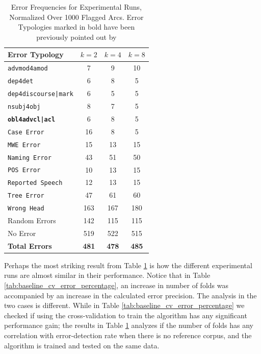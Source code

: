 \begin{table}[h]
    \centering
    \begin{tabular}{|l|c|c|c|}
        \hline
        \textbf{Error Typology} & \textbf{\(k = 2\)} & \textbf{\(k= 4\)} & \textbf{\(k=8\)} \\
        \hline
        \texttt{advmod4amod} & 7 & 9 & 10\\
        \texttt{dep4det} & 6 & 8 & 5\\
        \texttt{dep4discourse|mark} & 6 & 5 & 5\\
        \texttt{nsubj4obj} & 8 & 7 & 5\\
        \textbf{\texttt{obl4advcl|acl}} & 6 & 8 & 5\\
        \texttt{Case Error} & 16 & 8 & 5\\
        \texttt{MWE Error} & 15 & 13 & 15\\
        \texttt{Naming Error} & 43 & 51 & 50\\
        \texttt{POS Error} & 10 & 13 & 15\\
        \texttt{Reported Speech} & 12 & 13 & 15\\
        \texttt{Tree Error} & 47 & 61 & 60\\
        \texttt{Wrong Head} & 163 & 167 & 180\\
        Random Errors & 142 & 115 & 115\\
        No Error & 519 & 522 & 515\\
        \hline
        \textbf{Total Errors} & \textbf{481} & \textbf{478} & \textbf{485}\\
\hline
    \end{tabular}
    \caption[Error Frequencies for Experimental Runs, Normalized Over 1000 Flagged Arcs]{Error Frequencies for Experimental Runs, Normalized Over 1000 Flagged Arcs. Error Typologies marked in bold have been previously pointed out by \cite{alzetta2017dangerous}}
    \label{tab:normalized_experimental_lisca}
\end{table}

Perhaps the most striking result from Table \ref{tab:normalized_experimental_lisca} is how the different experimental runs are almost similar in their performance. Notice that in Table \ref{tab:baseline_cv_error_percentage}, an increase in number of folds was accompanied by an increase in the calculated error precision. The analysis in the two cases is different. While in Table \ref{tab:baseline_cv_error_percentage} we checked if using the cross-validation to train the algorithm has any significant performance gain; the results in Table \ref{tab:normalized_experimental_lisca} analyzes if the number of folds has any correlation with error-detection rate when there is no reference corpus, and the algorithm is trained and tested on the same data. 

